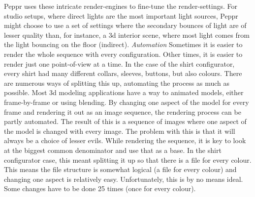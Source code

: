 Peppr uses these intricate render-engines to fine-tune the render-settings. For studio setups, where direct lights are the most important light sources, Peppr might choose to use a set of settings where the secondary bounces of light are of lesser quality than, for instance, a 3d interior scene, where most light comes from the light bouncing on the floor (indirect).
\newline
\newline
\textit{Automation}
\newline
Sometimes it is easier to render the whole sequence with every configuration. Other times, it is easier to render just one point-of-view at a time. In the case of the shirt configurator, every shirt had many different collars, sleeves, buttons, but also colours. There are numerous ways of splitting this up, automating the process as much as possible. Most 3d modeling applications have a way to animated models, either frame-by-frame or using blending. By changing one aspect of the model for every frame and rendering it out as an image sequence, the rendering process can be partly automated. The result of this is a sequence of images where one aspect of the model is changed with every image. The problem with this is that it will always be a choice of lesser evils. While rendering the sequence, it is key to look at the biggest common denominator and use that as a base. In the shirt configurator case, this meant splitting it up so that there is a file for every colour. This means the file structure is somewhat logical (a file for every colour) and changing one aspect is relatively easy. Unfortunately, this is by no means ideal. Some changes have to be done 25 times (once for every colour).


